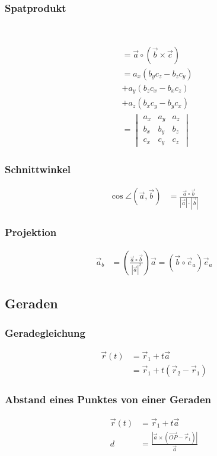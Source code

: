 \begin{multicols}{2}
\subsubsection*{Spatprodukt}
\\

\begin{align*} 
[\vec{a}\vec{b}\vec{c}]  &=\vec{a}\circ(\vec{b}\times\vec{c})\\
&=a_x(b_yc_z-b_zc_y)\\&+a_y(b_zc_x-b_xc_z)\\&+a_z(b_xc_y-b_yc_x)\\
&=\begin{vmatrix}a_x&a_y&a_z\\b_x&b_y&b_z\\c_x&c_y&c_z\end{vmatrix}
\end{align*}
\vfill
\subsubsection*{Schnittwinkel}
\begin{align*} 
\cos\angle(\vec{a},\vec{b})&=\frac{\vec{a}\circ\vec{b}}{|\vec{a}|\cdot|\vec{b}|}
\end{align*}

\subsubsection*{Projektion}
\begin{align*} 
\vec{a}_b&=\left(\frac{\vec{a}\circ\vec{b}}{|\vec{a}|^2}\right)\vec{a}=(\vec{b}\circ\vec{e}_a)\vec{e}_a
\end{align*}
\vfill
\end{multicols}


\subsection{Geraden}
\begin{multicols}{2}
\subsubsection*{Geradegleichung}
\begin{align*} 
\vec{r}(t) &=\vec{r}_1+t\vec{a}\\
	  &=\vec{r}_1+t(\vec{r}_2-\vec{r}_1)
\end{align*}
\vfill
\subsubsection*{Abstand eines Punktes von einer Geraden}
\begin{align*} 
\vec{r}(t) &=\vec{r}_1+t\vec{a}\\
d&=\frac{|\vec{a}\times\left(\vec{OP}-\vec{r}_1\right)|}{\vec{a}}
\end{align*}
\vfill
\end{multicols}

